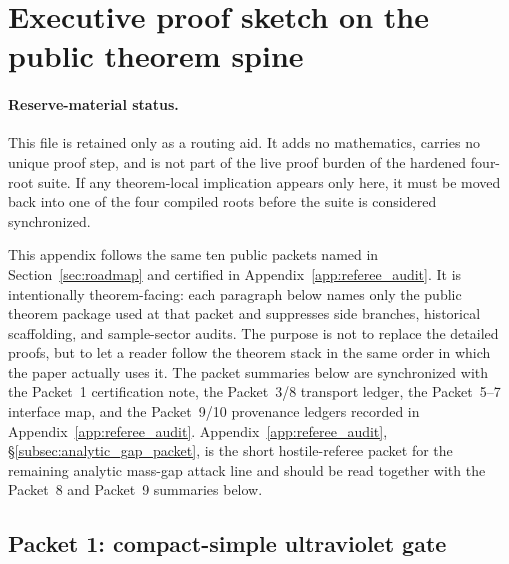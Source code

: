 \section{Executive proof sketch on the public theorem spine}
\label{app:executive_proof_sketch}

\paragraph{Reserve-material status.}
This file is retained only as a routing aid. It adds no mathematics, carries no unique proof step, and is not part of the live proof burden of the hardened four-root suite. If any theorem-local implication appears only here, it must be moved back into one of the four compiled roots before the suite is considered synchronized.




This appendix follows the same ten public packets named in Section~\ref{sec:roadmap} and certified in Appendix~\ref{app:referee_audit}.
It is intentionally theorem-facing: each paragraph below names only the public theorem package used at that packet and suppresses side branches, historical scaffolding, and sample-sector audits.
The purpose is not to replace the detailed proofs, but to let a reader follow the theorem stack in the same order in which the paper actually uses it.
The packet summaries below are synchronized with the Packet~1 certification note, the Packet~3/8 transport ledger, the Packet~5--7 interface map, and the Packet~9/10 provenance ledgers recorded in Appendix~\ref{app:referee_audit}.
Appendix~\ref{app:referee_audit}, \S\ref{subsec:analytic_gap_packet}, is the short hostile-referee packet for the remaining analytic mass-gap attack line and should be read together with the Packet~8 and Packet~9 summaries below.

\subsection{Packet 1: compact-simple ultraviolet gate}


